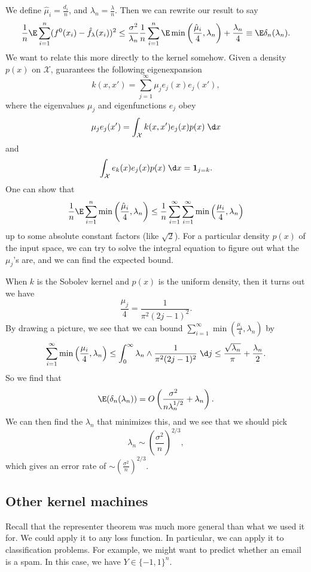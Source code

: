 \documentclass[a4paper]{article}
\begin{document}
We define $\hat{\mu}_i = \frac{d_i}{n}$, and $\lambda_n = \frac{\lambda}{n}$. Then we can rewrite our result to say
\[
  \frac{1}{n} \E \sum_{i = 1}^n (f^0(x_i) - \hat{f}_\lambda (x_i))^2 \leq \frac{\sigma^2}{\lambda_n} \frac{1}{n} \sum_{i = 1}^n \E \min\left(\frac{\hat{\mu}_i}{4}, \lambda_n\right) + \frac{\lambda_n}{4} \equiv \E \delta_n(\lambda_n).
\]
We want to relate this more directly to the kernel somehow. Given a density $p(x)$ on $\mathcal{X}$,  guarantees the following eigenexpansion
\[
  k(x, x') = \sum_{j = 1}^\infty \mu_j e_j(x) e_j(x'),
\]
where the eigenvalues $\mu_j$ and eigenfunctions $e_j$ obey
\[
  \mu_j e_j(x') = \int_{\mathcal{X}} k(x, x') e_j(x) p(x)\;\d x
\]
and
\[
  \int_{\mathcal{X}} e_k(x) e_j(x) p(x)\;\d x = \mathbf{1}_{j = k}.
\]
One can show that
\[
  \frac{1}{n} \E \sum_{i = 1}^n \min \left(\frac{\hat{\mu}_i}{4}, \lambda_n\right) \leq \frac{1}{n} \sum_{i = 1}^\infty \sum_{i = 1}^\infty \min\left(\frac{\mu_i}{4}, \lambda_n\right)
\]
up to some absolute constant factors (like $\sqrt{2}$). For a particular density $p(x)$ of the input space, we can try to solve the integral equation to figure out what the $\mu_j$'s are, and we can find the expected bound.

When $k$ is the Sobolev kernel and $p(x)$ is the uniform density, then it turns out we have
\[
  \frac{\mu_j}{4} = \frac{1}{\pi^2(2j - 1)^2}.
\]
By drawing a picture, we see that we can bound $\sum_{i = 1}^\infty \min \left(\frac{\mu_i}{4} , \lambda_n\right)$ by
\[
  \sum_{i = 1}^\infty \min \left(\frac{\mu_i}{4} , \lambda_n\right) \leq \int_0^\infty \lambda_n \wedge \frac{1}{\pi^2(2j - 1)^2}\;\d j \leq \frac{\sqrt{\lambda_n}}{\pi} + \frac{\lambda_n}{2}.
\]
So we find that
\[
  \E(\delta_n(\lambda_n)) = O \left(\frac{\sigma^2}{n \lambda_n^{1/2}} + \lambda_n\right).
\]
We can then find the $\lambda_n$ that minimizes this, and we see that we should pick
\[
  \lambda_n \sim \left(\frac{\sigma^2}{n}\right)^{2/3},
\]
which gives an error rate of $\sim \left(\frac{\sigma^2}{n}\right)^{2/3}$.

\subsection{Other kernel machines}
Recall that the representer theorem was much more general than what we used it for. We could apply it to any loss function. In particular, we can apply it to classification problems. For example, we might want to predict whether an email is a spam. In this case, we have $Y \in \{-1, 1\}^n$.
\end{document}

